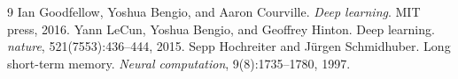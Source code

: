 \documentclass{article}
\begin{document}
                                                                    \begin{thebibliography}{9}
                                                                     Ian Goodfellow, Yoshua Bengio, and Aaron Courville. \textit{Deep learning}. MIT press, 2016.
                                                                     Yann LeCun, Yoshua Bengio, and Geoffrey Hinton. Deep learning. \textit{nature}, 521(7553):436--444, 2015.
                                                                     Sepp Hochreiter and J\"urgen Schmidhuber. Long short-term memory. \textit{Neural computation}, 9(8):1735--1780, 1997.
                                                                    \end{thebibliography}

                                                                    
\end{document}
